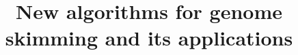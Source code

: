 \documentclass{NSF}
\begin{document}

\title{New algorithms for genome skimming and its applications}

\newcommand{\INST}[1]{{\color{grey} #1}}




\clearpage
\newpage{}


\newpage{}
\renewcommand\refname{References Cited}


%

\newpage{}


\newpage{}


\newpage{}


\newpage{}


\newpage{}
\end{document}
